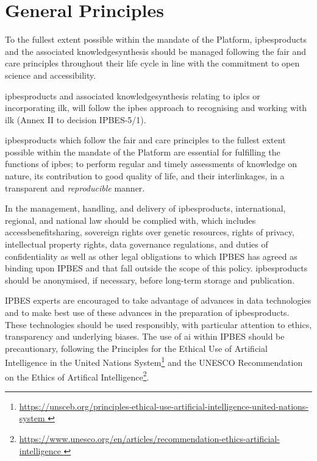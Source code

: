 \documentclass{article}
\begin{document}
\section{General Principles}

To the fullest extent possible within the mandate of the Platform, \glspl{ipbesproduct} and the associated \gls{knowledgesynthesis} should be managed following the \gls{fair} and \gls{care} principles throughout their life cycle in line with the commitment to open science and accessibility.

\glspl{ipbesproduct} and associated \gls{knowledgesynthesis} relating to \glspl{iplc} or incorporating \gls{ilk}, will follow the \gls{ipbes} approach to recognising and working with \gls{ilk} (Annex II to decision IPBES-5/1).

\glspl{ipbesproduct} which follow the \gls{fair} and \gls{care} principles to the fullest extent possible within the mandate of the Platform are essential for fulfilling the functions of \gls{ipbes}; to perform regular and timely assessments of \gls{knowledge} on nature, its contribution to good quality of life, and their interlinkages, in a transparent and \textit{reproducible} manner.

In the management, handling, and delivery of \glspl{ipbesproduct}, international, regional, and national law should be complied with, which includes \gls{accessbenefitsharing}, sovereign rights over genetic resources, rights of privacy, intellectual property rights, \gls{data} governance regulations, and duties of confidentiality as well as other legal obligations to which IPBES has agreed as binding upon IPBES and that fall outside the scope of this policy. \glspl{ipbesproduct} should be anonymised, if necessary, before long-term storage and publication.

IPBES experts are encouraged to take advantage of advances in \gls{data} technologies and to make best use of these advances in the preparation of \glspl{ipbesproduct}. These technologies should be used responsibly, with particular attention to ethics, transparency and underlying biases. The use of \gls{ai} within IPBES should be precautionary, following the Principles for the Ethical Use of Artificial Intelligence in the United Nations System\footnote{\href{https://unsceb.org/principles-ethical-use-artificial-intelligence-united-nations-system }{https://unsceb.org/principles-ethical-use-artificial-intelligence-united-nations-system }} and the UNESCO Recommendation on the Ethics of Artifical Intelligence\footnote{\href{https://www.unesco.org/en/articles/recommendation-ethics-artificial-intelligence }{https://www.unesco.org/en/articles/recommendation-ethics-artificial-intelligence }}.
\end{document}
